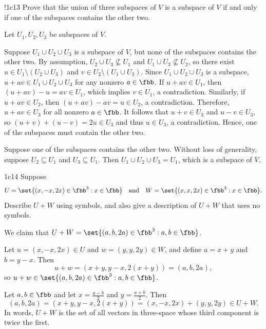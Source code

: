 \begin{exercise}!{1c13}
    Prove that the union of three subspaces of $V$ is a subspace of $V$ if and only if one of the subspaces contains the other two.

\end{exercise}

\begin{sol}
    Let $U_1, U_2, U_3$ be subspaces of $V$.

    \rightimp Suppose $U_1 \cup U_2 \cup U_3$ is a subspace of $V$, but none of the subspaces contains the other two.
    By assumption, $U_2 \cup U_3 \nsubseteq U_1$ and $U_1 \cup U_3 \nsubseteq U_2$, so there exist $u \in U_1 \setminus (U_2 \cup U_3)$ and $v \in U_2 \setminus (U_1 \cup U_3)$.
    Since $U_1 \cup U_2 \cup U_3$ is a subspace, $u + av \in U_1 \cup U_2 \cup U_3$ for any nonzero $a \in \fbb$.
    If $u + av \in U_1$, then $(u + av) - u = av \in U_1$, which implies $v \in U_1$, a contradiction.
    Similarly, if $u + av \in U_2$, then $(u + av) - av = u \in U_2$, a contradiction.
    Therefore, $u + av \in U_3$ for all nonzero $a \in \fbb$.
    It follows that $u + v \in U_3$ and $u - v \in U_3$, so $(u + v) + (u - v) = 2u \in U_3$ and thus $u \in U_3$, a contradiction.
    Hence, one of the subspaces must contain the other two.

    \leftimp Suppose one of the subspaces contains the other two.
    Without loss of generality, suppose $U_2 \subseteq U_1$ and $U_3 \subseteq U_1$.
	Then $U_1 \cup U_2 \cup U_3 = U_1$, which is a subspace of $V$.
\end{sol}

\begin{exercise}{1c14}
    Suppose
    \[
    	U = \set{(x, -x, 2x) \in \fbb^3 : x \in \fbb} \quad \text{and} \quad W = \set{(x, x, 2x) \in \fbb^3 : x \in \fbb}.
    \]
    Describe $U + W$ using symbols, and also give a description of $U + W$ that uses no symbols.
\end{exercise}

\begin{sol}
    We claim that $U + W = \set{(a, b, 2a) \in \fbb^3 : a, b \in \fbb}$.

    \rightset Let $u = (x, -x, 2x) \in U$ and $w = (y, y, 2y) \in W$, and define $a = x + y$ and $b = y - x$.
    Then
    \[
        u + w = (x + y, y - x, 2(x + y)) = (a, b, 2a),
    \]
    so $u + w \in \set{(a, b, 2a) \in \fbb^3 : a, b \in \fbb}$.

    \leftset Let $a, b \in \fbb$ and let $x = \frac{a - b}{2}$ and $y = \frac{a + b}{2}$.
    Then
    \[
        (a, b, 2a) = (x + y, y - x, 2(x + y)) = (x, -x, 2x) + (y, y, 2y) \in U + W.
    \]
    In words, $U + W$ is the set of all vectors in three-space whose third component is twice the first.
\end{sol}

